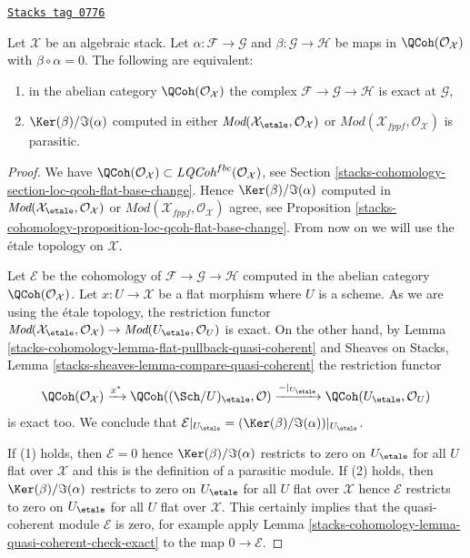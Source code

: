 \begin{lemma}
\label{stacks-cohomology-lemma-exact-sequence-quasi-coherent-parasitic-cohomology}
\href{https://stacks.math.columbia.edu/tag/0776}{\texttt{Stacks tag 0776}}

Let $\mathcal{X}$ be an algebraic stack. Let
$\alpha : \mathcal{F} \to \mathcal{G}$ and
$\beta : \mathcal{G} \to \mathcal{H}$
be maps in $\QCoh(\mathcal{O}_\mathcal{X})$ with
$\beta \circ \alpha = 0$. The following are equivalent:
\begin{enumerate}
\item in the abelian category $\QCoh(\mathcal{O}_\mathcal{X})$
the complex $\mathcal{F} \to \mathcal{G} \to \mathcal{H}$
is exact at $\mathcal{G}$,
\item $\Ker(\beta)/\Im(\alpha)$ computed in either
$\textit{Mod}(\mathcal{X}_\etale, \mathcal{O}_\mathcal{X})$ or
$\textit{Mod}(\mathcal{X}_{fppf}, \mathcal{O}_\mathcal{X})$
is parasitic.
\end{enumerate}
\end{lemma}

\begin{proof}
We have $\QCoh(\mathcal{O}_\mathcal{X}) \subset
\textit{LQCoh}^{fbc}(\mathcal{O}_\mathcal{X})$, see
Section \ref{stacks-cohomology-section-loc-qcoh-flat-base-change}.
Hence $\Ker(\beta)/\Im(\alpha)$ computed in
$\textit{Mod}(\mathcal{X}_\etale, \mathcal{O}_\mathcal{X})$ or
$\textit{Mod}(\mathcal{X}_{fppf}, \mathcal{O}_\mathcal{X})$ agree, see
Proposition \ref{stacks-cohomology-proposition-loc-qcoh-flat-base-change}.
From now on we will use the \'etale topology on $\mathcal{X}$.

\medskip\noindent
Let $\mathcal{E}$ be the cohomology of
$\mathcal{F} \to \mathcal{G} \to \mathcal{H}$
computed in the abelian category $\QCoh(\mathcal{O}_\mathcal{X})$.
Let $x : U \to \mathcal{X}$ be a flat morphism where $U$ is a scheme.
As we are using the \'etale topology, the restriction functor
$\textit{Mod}(\mathcal{X}_\etale, \mathcal{O}_\mathcal{X})
\to \textit{Mod}(U_\etale, \mathcal{O}_U)$ is exact.
On the other hand, by Lemma \ref{stacks-cohomology-lemma-flat-pullback-quasi-coherent} and
Sheaves on Stacks, Lemma \ref{stacks-sheaves-lemma-compare-quasi-coherent}
the restriction functor
$$
\QCoh(\mathcal{O}_\mathcal{X}) \xrightarrow{x^*}
\QCoh((\Sch/U)_\etale, \mathcal{O}) \xrightarrow{{-}|_{U_\etale}}
\QCoh(U_\etale, \mathcal{O}_U)
$$
is exact too. We conclude that
$\mathcal{E}|_{U_\etale} = (\Ker(\beta)/\Im(\alpha))|_{U_\etale}$.

\medskip\noindent
If (1) holds, then $\mathcal{E} = 0$ hence $\Ker(\beta)/\Im(\alpha)$
restricts to zero on $U_\etale$ for all $U$ flat over $\mathcal{X}$ and this
is the definition of a parasitic module. If (2) holds, then
$\Ker(\beta)/\Im(\alpha)$ restricts to zero on $U_\etale$ for all $U$
flat over $\mathcal{X}$ hence $\mathcal{E}$ restricts to zero on
$U_\etale$ for all $U$ flat over $\mathcal{X}$. This certainly implies
that the quasi-coherent module $\mathcal{E}$ is zero, for example apply
Lemma \ref{stacks-cohomology-lemma-quasi-coherent-check-exact}
to the map $0 \to \mathcal{E}$.
\end{proof}

